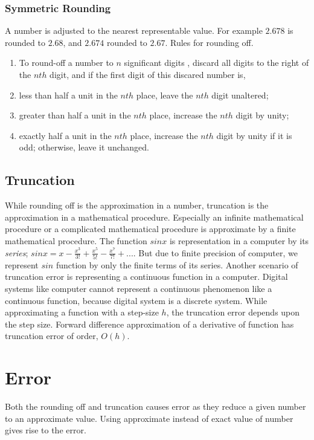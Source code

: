 \documentclass[aima203_lecturenotes_ku.tex]{subfiles}
\begin{document}
\subsubsection{Symmetric Rounding}
A number is adjusted to the nearest representable value. For example $2.678$ is rounded to $2.68$, and $2.674$ rounded to $2.67$.
Rules for rounding off.
\begin{enumerate}
\item To round-off a number to \(n\) significant digits , discard all digits to the right of the \(nth\) digit, and if the first digit of this discared number is,

\item less than half a unit in the \(nth\) place, leave the \(nth\) digit unaltered;

\item greater than half a unit in the \(nth\) place, increase the \(nth\) digit by unity;

\item exactly half a unit in the \(nth\) place, increase the \(nth\) digit by unity if it is odd; otherwise, leave it unchanged.
\end{enumerate}

\subsection{Truncation}
While rounding off is the approximation in a number, truncation is the approximation in a mathematical procedure. Especially an infinite mathematical procedure or a complicated mathematical procedure is approximate by a finite mathematical procedure. The function $sinx$ is representation in a computer by its \textit{series}; $ sinx = x-\frac{x^3}{3!} + \frac{x^5}{5!} -\frac{x^7}{7!} + ...$. But due to finite precision of computer, we represent $sin$ function by only the finite terms of its series. Another scenario of truncation error is representing a continuous function in a computer. Digital systems like computer cannot represent a continuous phenomenon like a continuous function, because digital system is a discrete system. While approximating a function with a step-size $h$, the truncation error depends upon the step size. Forward difference approximation of a derivative of function has truncation error of order, $O(h)$.

\section{Error}
Both the rounding off and truncation causes error as they reduce a given number to an approximate value. Using approximate instead of exact value of number gives rise to the error.
\end{document}

